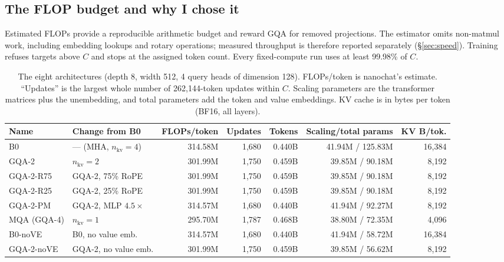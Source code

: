 \documentclass[10pt,twocolumn]{article}
\begin{document}
\subsection{The FLOP budget and why I chose it}\label{sec:budget}
Estimated FLOPs provide a reproducible arithmetic budget and reward GQA for removed projections.
The estimator omits non-matmul work, including embedding lookups and rotary operations; measured throughput is
therefore reported separately (\S\ref{sec:speed}). Training refuses targets above $C$ and stops at the assigned token
count. Every fixed-compute run uses at least 99.98\% of $C$.

\begin{table}[t]
\centering\small
\caption{The eight architectures (depth 8, width 512, 4 query heads of dimension 128). FLOPs/token is nanochat's
estimate. ``Updates'' is the largest whole number of 262{,}144-token updates within $C$. Scaling parameters are the
transformer matrices plus the unembedding, and total parameters add the token and value embeddings. KV cache is in bytes per token
(BF16, all layers).}
\label{tab:arch}
\setlength{\tabcolsep}{2.5pt}
\begin{tabular}{@{}llrrrrr@{}}
\toprule
Name & Change from B0 & FLOPs/token & Updates & Tokens & Scaling/total params & KV B/tok. \\
\midrule
B0 & --- (MHA, $n_\text{kv}=4$) & 314.58M & 1{,}680 & 0.440B & 41.94M / 125.83M & 16{,}384 \\
GQA-2 & $n_\text{kv}=2$ & 301.99M & 1{,}750 & 0.459B & 39.85M / 90.18M & 8{,}192 \\
GQA-2-R75 & GQA-2, 75\% RoPE & 301.99M & 1{,}750 & 0.459B & 39.85M / 90.18M & 8{,}192 \\
GQA-2-R25 & GQA-2, 25\% RoPE & 301.99M & 1{,}750 & 0.459B & 39.85M / 90.18M & 8{,}192 \\
GQA-2-PM & GQA-2, MLP $4.5\times$ & 314.57M & 1{,}680 & 0.440B & 41.94M / 92.27M & 8{,}192 \\
MQA (GQA-4) & $n_\text{kv}=1$ & 295.70M & 1{,}787 & 0.468B & 38.80M / 72.35M & 4{,}096 \\
B0-noVE & B0, no value emb. & 314.57M & 1{,}680 & 0.440B & 41.94M / 58.72M & 16{,}384 \\
GQA-2-noVE & GQA-2, no value emb. & 301.99M & 1{,}750 & 0.459B & 39.85M / 56.62M & 8{,}192 \\
\bottomrule
\end{tabular}
\end{table}
\end{document}
